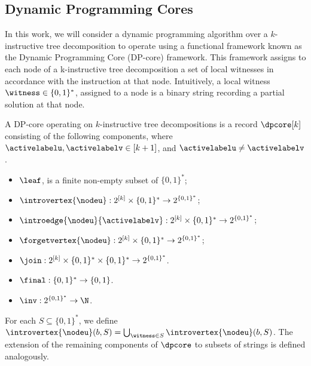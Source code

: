 \subsection{Dynamic Programming Cores}\label{DPcores}

In this work, we will consider a dynamic programming algorithm over a $k$-instructive tree decomposition to operate using a functional framework known as the Dynamic Programming Core (DP-core) \cite{Baste2022,From2023} framework. 
This framework assigns to each node of a k-instructive tree decomposition a set of local witnesses in accordance with the instruction at that node. Intuitively, a local witness $\witness \in \{0,1\}^*$, assigned to a node is a binary string recording a partial solution at that node.

A DP-core operating on $k$-instructive tree decompositions is a record $\dpcore[k]$ consisting of the following components, where $\activelabelu,\activelabelv \in [k+1]$, and 
$\activelabelu\neq \activelabelv$. 


\begin{itemize}
    \item $\leaf$, is a finite non-empty subset of ${\{0,1\}^*}$;
    \item $\introvertex{\nodeu}:2^{[k]}\times \{0,1\}^*\rightarrow 2^{\{0,1\}^*}$;
    \item $\introedge{\nodeu}{\activelabelv}:2^{[k]}\times\{0,1\}^*\rightarrow 2^{\{0,1\}^*}$;
    \item $\forgetvertex{\nodeu}:2^{[k]}\times \{0,1\}^*\rightarrow 2^{\{0,1\}^*}$;
    \item $\join:2^{[k]}\times \{0,1\}^*\times \{0,1\}^*\rightarrow 2^{\{0,1\}^*}$.
    \item $\final:\{0,1\}^*\rightarrow \{0,1\}$. 
    \item $\inv:2^{\{0,1\}^*}\rightarrow \N$. 
\end{itemize}
%

For each $S\subseteq \{0,1\}^*$, we define $\introvertex{\nodeu}(b,S) = \bigcup_{\witness\in S} \introvertex{\nodeu}(b,S)$. 
The extension of the remaining components of $\dpcore$ to subsets of strings is defined analogously. 



